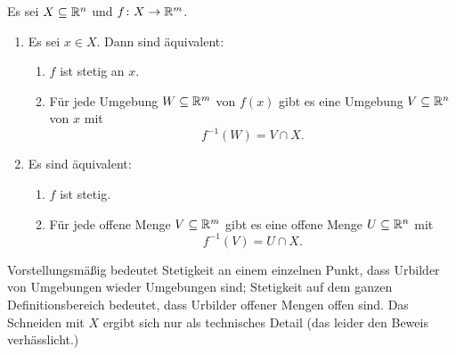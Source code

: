 \documentclass[a4paper,10pt]{article}
\begin{document}
\begin{lem}
 Es sei $X \subseteq \mathbb{R}^n$ und $f \colon X \to \mathbb{R}^m$.
 \begin{enumerate}
  \item
   Es sei $x \in X$. Dann sind äquivalent:
   \begin{enumerate}
    \item\label{enum: stetig an x epsilon delta}
     $f$ ist stetig an $x$.
    \item\label{enum: stetig an x Umgebungen}
     Für jede Umgebung $W \subseteq \mathbb{R}^m$ von $f(x)$ gibt es eine Umgebung $V \subseteq \mathbb{R}^n$ von $x$ mit
     \[
      f^{-1}(W) = V \cap X.
     \]
   \end{enumerate}
  \item
   Es sind äquivalent:
   \begin{enumerate}
    \item\label{enum: stetig epsilon delta}
     $f$ ist stetig.
    \item\label{enum: stetig offene Mengen}
     Für jede offene Menge $V \subseteq \mathbb{R}^m$ gibt es eine offene Menge $U \subseteq \mathbb{R}^n$ mit
     \[
      f^{-1}(V) = U \cap X.
     \]
   \end{enumerate}
 \end{enumerate}
\end{lem}


Vorstellungsmäßig bedeutet Stetigkeit an einem einzelnen Punkt, dass Urbilder von Umgebungen wieder Umgebungen sind; Stetigkeit auf dem ganzen Definitionsbereich bedeutet, dass Urbilder offener Mengen offen sind. Das Schneiden mit $X$ ergibt sich nur als technisches Detail (das leider den Beweis verhässlicht.)
\end{document}

